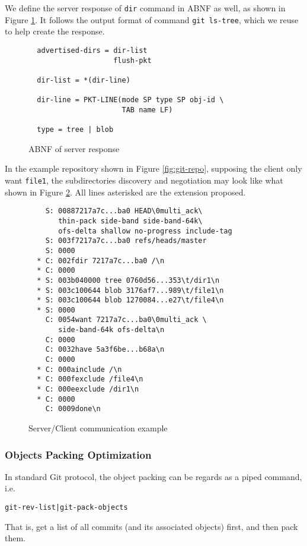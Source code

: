 \documentclass[preprint]{sigplanconf}
\begin{document}
We define the server response of \verb|dir| command in ABNF as well, as shown
in Figure \ref{fig:server-response-ABNF}.
It follows the output format of command \verb|git ls-tree|, which we reuse to
help create the response.
\begin{figure}[htpb]
  \centering
  \begin{verbatim}
  advertised-dirs = dir-list
                    flush-pkt

  dir-list = *(dir-line)

  dir-line = PKT-LINE(mode SP type SP obj-id \
                      TAB name LF)

  type = tree | blob
  \end{verbatim}
  \caption{ABNF of server response}
  \label{fig:server-response-ABNF}
\end{figure}

In the example repository shown in Figure \ref{fig:git-repo}, supposing the
client only want \verb|file1|, the subdirectories discovery and negotiation may
look like what shown in Figure \ref{fig:c/s-comm}.
All lines asterisked are the extension proposed.

\begin{figure}[htpb]
  \centering
  \begin{verbatim}
    S: 00887217a7c...ba0 HEAD\0multi_ack\
       thin-pack side-band side-band-64k\
       ofs-delta shallow no-progress include-tag
    S: 003f7217a7c...ba0 refs/heads/master
    S: 0000
  * C: 002fdir 7217a7c...ba0 /\n
  * C: 0000
  * S: 003b040000 tree 0760d56...353\t/dir1\n
  * S: 003c100644 blob 3176af7...989\t/file1\n
  * S: 003c100644 blob 1270084...e27\t/file4\n
  * S: 0000
    C: 0054want 7217a7c...ba0\0multi_ack \
       side-band-64k ofs-delta\n
    C: 0000
    C: 0032have 5a3f6be...b68a\n
    C: 0000
  * C: 000ainclude /\n
  * C: 000fexclude /file4\n
  * C: 000eexclude /dir1\n
  * C: 0000
    C: 0009done\n
  \end{verbatim}
  \caption{Server/Client communication example}
  \label{fig:c/s-comm}
\end{figure}

\subsubsection{Objects Packing Optimization}
In standard Git protocol, the object packing can be regards as a piped command,
i.e.
\begin{verbatim}
git-rev-list|git-pack-objects
\end{verbatim}
That is, get a list of all commits (and its associated objects) first, and then
pack them.
\end{document}
